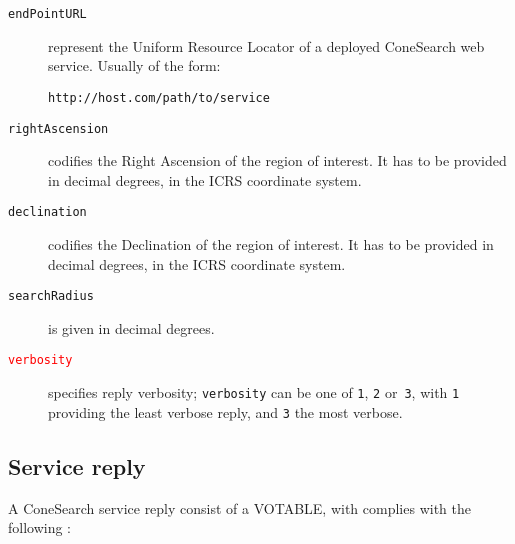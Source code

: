 	\begin{description}
		\item[\texttt{endPointURL}] represent the Uniform Resource 
		Locator of a deployed ConeSearch web service. 
		Usually of the form:
		
		\texttt{http://host.com/path/to/service}

		\item[\texttt{rightAscension}] codifies the Right Ascension 
		of the region of interest. It has to be provided in decimal 
		degrees, in the ICRS coordinate system.

		\item[\texttt{declination}] codifies the Declination of the 
		region of interest. It has to be provided in decimal 
		degrees, in the ICRS coordinate system.

		\item[\texttt{searchRadius}] is given in decimal degrees.

		\item[\textcolor{red}{\texttt{verbosity}}] specifies reply
        verbosity; \texttt{verbosity} can be one of \texttt{1},
        \texttt{2} or~\texttt{3},
		with \texttt{1} providing the least verbose
        reply, and \texttt{3} the most verbose.
	\end{description}
	
		
	\subsection{Service reply} %
	\label{sub:service_reply_scs}
	
	A ConeSearch service reply consist of a VOTABLE, with complies with 
	the following :

